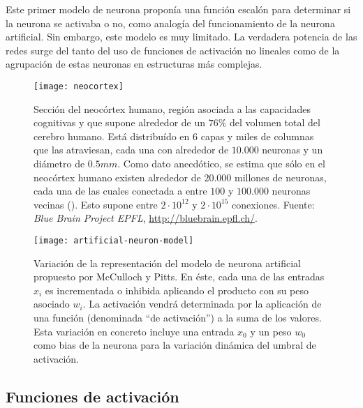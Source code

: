 Este primer modelo de neurona proponía una función escalón para determinar si la neurona se activaba o no, como analogía del funcionamiento de la neurona artificial. Sin embargo, este modelo es muy limitado. La verdadera potencia de las redes surge del tanto del uso de funciones de activación no lineales como de la agrupación de estas neuronas en estructuras más complejas.

\begin{figure}[t]
	\centering
	\texttt{[image: neocortex]}
	\caption[Ilustración de una sección del neocórtex humano]{Sección del neocórtex humano, región asociada a las capacidades cognitivas y que supone alrededor de un $76\%$ del volumen total del cerebro humano. Está distribuído en $6$ capas y miles de columnas que las atraviesan, cada una con alrededor de $10.000$ neuronas y un diámetro de $0.5mm$.  Como dato anecdótico, se estima que sólo en el neocórtex humano existen alrededor de $20.000$ millones de neuronas, cada una de las cuales conectada a entre $100$ y $100.000$ neuronas vecinas (\cite{Pakkenberg1997}). Esto supone entre $2 \cdot 10^{12}$ y $2 \cdot 10^{15}$ conexiones. Fuente: \textit{Blue Brain Project EPFL}, \url{http://bluebrain.epfl.ch/}.}
	\label{fig:neocortex}
\end{figure}

\begin{figure}[!b]
	\centering
	\texttt{[image: artificial-neuron-model]}
	\caption[Modelo de neurona artificial de McCulloch y Pitts]{Variación de la representación del modelo de neurona artificial propuesto por McCulloch y Pitts. En éste, cada una de las entradas $x_i$ es incrementada o inhibida aplicando el producto con su peso asociado $w_i$. La activación vendrá determinada por la aplicación de una función (denominada \enquote{de activación}) a la suma de los valores. Esta variación en concreto incluye una entrada $x_0$ y un peso $w_0$ como bias de la neurona para la variación dinámica del umbral de activación.}
	\label{fig:mccullocs-pitts-neuron-model}
\end{figure}

\subsection{Funciones de activación}

